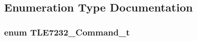 \subsection{Enumeration Type Documentation}
\hypertarget{group__tle7232__driver_gadfd620e995ab38cff032a38f7a26c750}{
\subsubsection[{T\-L\-E7232\-\_\-\-Command\-\_\-t}]{\setlength{\rightskip}{0pt plus 5cm}enum {\bf T\-L\-E7232\-\_\-\-Command\-\_\-t}}}\label{group__tle7232__driver_gadfd620e995ab38cff032a38f7a26c750}
